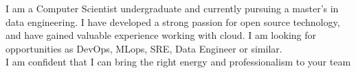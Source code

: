 \documentclass[letter,10pt]{article}
\begin{document}



I am a Computer Scientist undergraduate and currently pursuing a master's in data engineering. I have developed a strong passion for open source technology, and have gained valuable experience working with cloud. I am looking for opportunities as DevOps, MLops, SRE, Data Engineer or similar. \\
I am confident that I can bring the right energy and professionalism to your team


\end{document}
